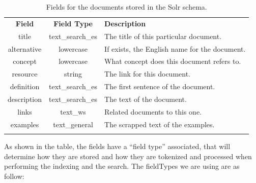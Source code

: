 \begin{center}
  \centering
  \begin{table}
  \begin{center}
    \begin{tabular*}{0.655\textwidth}{@{\extracolsep{\fill}} | c | c | p{} |}
      \hhline{|-|-|-|}
      \textbf{Field} & \textbf{Field Type} & \textbf{Description} \\ \hhline{|=|=|=|}
      title & text\_search\_es & The title of this particular document.  \\ \hhline{|-|-|-|}
      alternative & lowercase & If exists, the English name for the document. \\ \hhline{|-|-|-|}
      concept & lowercase & What concept does this document refers to. \\ \hhline{|-|-|-|}
      resource & string & The link for this document. \\ \hhline{|-|-|-|}
      definition & text\_search\_es & The first sentence of the document. \\ \hhline{|-|-|-|}
      description & text\_search\_es & The text of the document. \\ \hhline{|-|-|-|}
      links & text\_ws & Related documents to this one. \\ \hhline{|-|-|-|}
      examples & text\_general & The scrapped text of the examples. \\ \hhline{|-|-|-|}
      \end{tabular*}
    \caption{Fields for the documents stored in the Solr schema.}
    \label{tab:schema-docfields}
    \end{center}
  \end{table}
\end{center}

As shown in the table, the fields have a ``field type'' associated, that will determine how they are stored and how they are tokenized and processed when performing the indexing and the search. The fieldTypes we are using are as follow:

